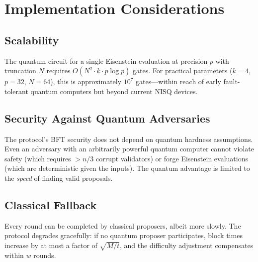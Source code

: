 \section{Implementation Considerations}


\subsection{Scalability}

The quantum circuit for a single Eisenstein evaluation at precision $p$
with truncation $N$ requires $O(N^2 \cdot k \cdot p \log p)$ gates.
For practical parameters ($k=4$, $p=32$, $N=64$), this is approximately
$10^7$ gates---within reach of early fault-tolerant quantum computers
but beyond current NISQ devices.

\subsection{Security Against Quantum Adversaries}

The protocol's BFT security does not depend on quantum hardness
assumptions. Even an adversary with an arbitrarily powerful quantum
computer cannot violate safety (which requires $> n/3$ corrupt
validators) or forge Eisenstein evaluations (which are deterministic
given the inputs). The quantum advantage is limited to the \emph{speed}
of finding valid proposals.

\subsection{Classical Fallback}

Every round can be completed by classical proposers, albeit more
slowly. The protocol degrades gracefully: if no quantum proposer
participates, block times increase by at most a factor of
$\sqrt{M/t}$, and the difficulty adjustment compensates within $w$
rounds.

